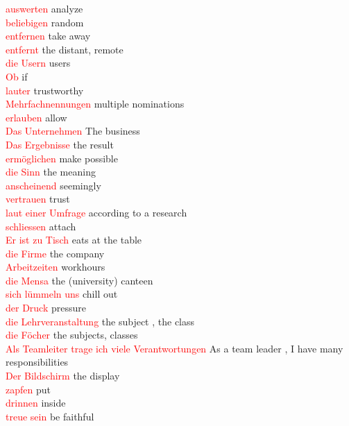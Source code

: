 \documentclass{article}
\begin{document}
\begin{multicols}{2}
	\textcolor{red}{auswerten} analyze \\
	\textcolor{red}{beliebigen} random\\
	\textcolor{red}{entfernen} take away\\
	\textcolor{red}{entfernt}  the distant, remote\\
	\textcolor{red}{die Usern} users\\
	\textcolor{red}{Ob} if\\
	\textcolor{red}{lauter} trustworthy\\
	\textcolor{red}{Mehrfachnennungen} multiple nominations\\
	\textcolor{red}{erlauben} allow\\
	\textcolor{red}{Das Unternehmen} The business\\
	\textcolor{red}{Das Ergebnisse} the result\\
	\textcolor{red}{ermöglichen} make possible\\
	\textcolor{red}{die Sinn} the meaning\\
	\textcolor{red}{anscheinend} seemingly\\
	\textcolor{red}{vertrauen} trust\\
	\textcolor{red}{laut einer Umfrage} according to a research\\
	\textcolor{red}{schliessen} attach\\
	\textcolor{red}{Er ist zu Tisch} eats at the table\\
	\textcolor{red}{die Firme} the company\\
	\textcolor{red}{Arbeitzeiten} workhours\\
	\textcolor{red}{die Mensa} the (university) canteen\\
	\textcolor{red}{sich lümmeln uns} chill out\\
	\textcolor{red}{der Druck} pressure\\
	\textcolor{red}{die Lehrveranstaltung} the subject , the class\\
	\textcolor{red}{die Föcher} the subjects, classes\\
	\textcolor{red}{Als Teamleiter trage ich viele Verantwortungen} As a team leader , I have many responsibilities\\
	\textcolor{red}{Der Bildschirm} the display\\
	\textcolor{red}{zapfen} put\\
	\textcolor{red}{drinnen} inside\\
	\textcolor{red}{treue sein} be faithful \\\\
	

\end{multicols}
\end{document}
